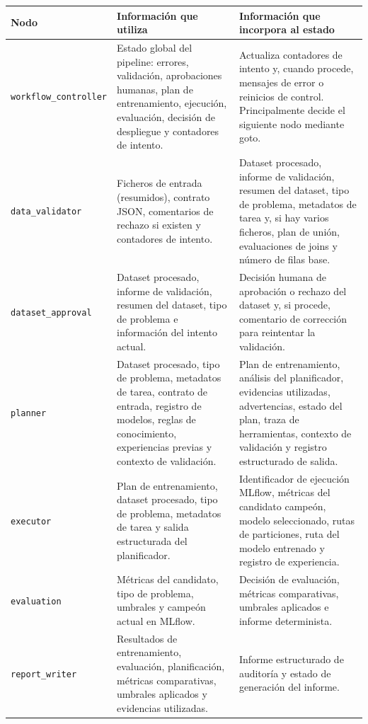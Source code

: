 \documentclass[12pt,a4paper]{article}
\theoremstyle{plain}
\begin{document}
\begin{table}[htbp]
\centering
\footnotesize
\setlength{\tabcolsep}{4pt}
\renewcommand{\arraystretch}{1.05}
\begin{tabularx}{\linewidth}{>{\RaggedRight\arraybackslash}p{3.8cm} >{\RaggedRight\arraybackslash}X >{\RaggedRight\arraybackslash}X}
\hline
\textbf{Nodo} & \textbf{Información que utiliza} & \textbf{Información que incorpora al estado} \\\hline
\texttt{workflow\_controller} & Estado global del pipeline: errores, validación, aprobaciones humanas, plan de entrenamiento, ejecución, evaluación, decisión de despliegue y contadores de intento. & Actualiza contadores de intento y, cuando procede, mensajes de error o reinicios de control. Principalmente decide el siguiente nodo mediante goto. \\\hline
\texttt{data\_validator} & Ficheros de entrada (resumidos), contrato JSON, comentarios de rechazo si existen y contadores de intento. & Dataset procesado, informe de validación, resumen del dataset, tipo de problema, metadatos de tarea y, si hay varios ficheros, plan de unión, evaluaciones de joins y número de filas base. \\\hline
\texttt{dataset\_approval} & Dataset procesado, informe de validación, resumen del dataset, tipo de problema e información del intento actual. & Decisión humana de aprobación o rechazo del dataset y, si procede, comentario de corrección para reintentar la validación. \\\hline
\texttt{planner} & Dataset procesado, tipo de problema, metadatos de tarea, contrato de entrada, registro de modelos, reglas de conocimiento, experiencias previas y contexto de validación. & Plan de entrenamiento, análisis del planificador, evidencias utilizadas, advertencias, estado del plan, traza de herramientas, contexto de validación y registro estructurado de salida. \\\hline
\texttt{executor} & Plan de entrenamiento, dataset procesado, tipo de problema, metadatos de tarea y salida estructurada del planificador. & Identificador de ejecución MLflow, métricas del candidato campeón, modelo seleccionado, rutas de particiones, ruta del modelo entrenado y registro de experiencia. \\\hline
\texttt{evaluation} & Métricas del candidato, tipo de problema, umbrales y campeón actual en MLflow. & Decisión de evaluación, métricas comparativas, umbrales aplicados e informe determinista. \\\hline
\texttt{report\_writer} & Resultados de entrenamiento, evaluación, planificación, métricas comparativas, umbrales aplicados y evidencias utilizadas. & Informe estructurado de auditoría y estado de generación del informe. \\\hline

\end{tabularx}
\end{table}
\end{document}
